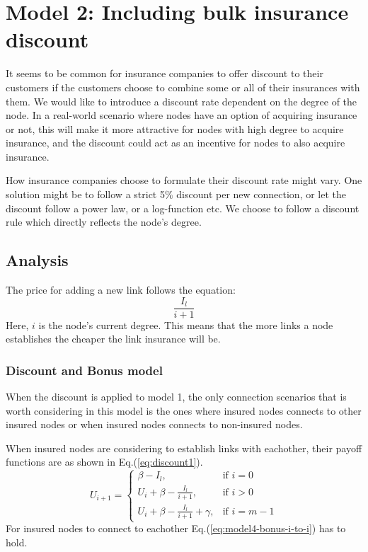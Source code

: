 \section{Model 2: Including bulk insurance discount}

 It seems to be common for insurance companies to offer discount to their customers if the customers choose to combine some or all of their insurances with them. We would like to introduce a discount rate dependent on the degree of the node. In a real-world scenario where nodes have an option of acquiring insurance or not, this will make it more attractive for nodes with high degree to acquire insurance, and the discount could act as an incentive for nodes to also acquire insurance. 

How insurance companies choose to formulate their discount rate might vary. One solution might be to follow a strict 5$\%$ discount per new connection, or let the discount follow a power law, or a log-function etc. We choose to follow a discount rule which directly reflects the node's degree.
\subsection{Analysis}
The price for adding a new link follows the equation:
\begin{equation}
\frac{I_{l}}{i+1}
\label{eq:discount0}
\end{equation}
Here, $i$ is the node's current degree. This means that the more links a node establishes the cheaper the link insurance will be. 

\subsubsection{Discount and Bonus model}
When the discount is applied to model 1, the only connection scenarios that is worth considering in this model is the ones where insured nodes connects to other insured nodes or when insured nodes connects to non-insured nodes.

When insured nodes are considering to establish links with eachother, their payoff functions are as shown in Eq.(\ref{eq:discount1}).  
\begin{equation}
    U_{i+1}= 
\begin{cases}
    \beta - I_{l},& \text{if } i = 0\\
    U_{i}+\beta -\frac{I_{l}}{i+1},& \text{if }  i>0\\
    U_{i}+\beta -\frac{I_{l}}{i+1}+\gamma,& \text{if } i=m-1
\end{cases}
\label{eq:discount1}
\end{equation}
For insured nodes to connect to eachother Eq.(\ref{eq:model4-bonus-i-to-i}) has to hold.

